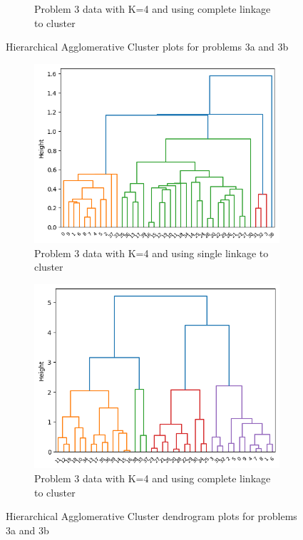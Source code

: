 \documentclass[12pt]{article}
\begin{document}
\begin{figure}[ht!]
\begin{subfigure}{0.45\textwidth}
        \caption{Problem 3 data with K=4 and using complete linkage to cluster}
    \end{subfigure}
    \caption{Hierarchical Agglomerative Cluster plots for problems 3a and 3b}\label{fig:3a}
\end{figure}

\begin{figure}[ht!]
    \begin{subfigure}{0.45\textwidth}
        \centering
        \includegraphics[width=\linewidth]{../plots/3a_single_dendrogram.png}
        \caption{Problem 3 data with K=4 and using single linkage to cluster}
    \end{subfigure}
    \begin{subfigure}{0.45\textwidth}
        \centering
        \includegraphics[width=\linewidth]{../plots/3a_complete_dendrogram.png}
        \caption{Problem 3 data with K=4 and using complete linkage to cluster}
    \end{subfigure}
    \caption{Hierarchical Agglomerative Cluster dendrogram plots for problems 3a and 3b}\label{fig:3a_den}
\end{figure}
\end{document}
